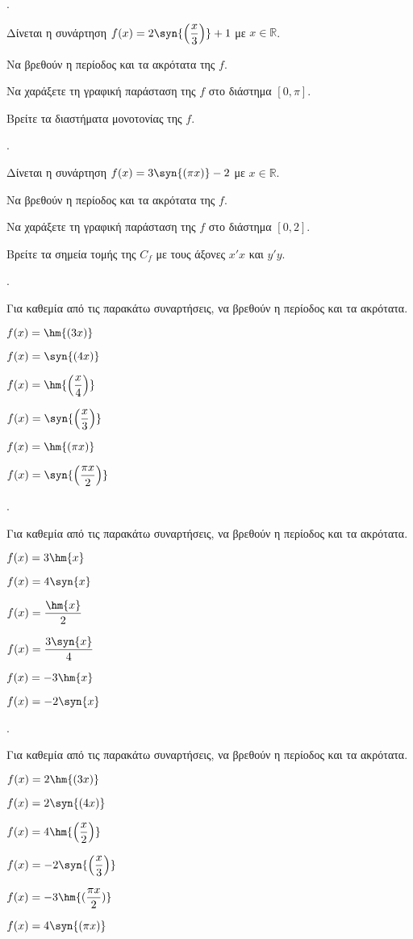\documentclass[11pt,a4paper,twocolumn]{article}
\newcounter{askhsh}
\newcommand{\askhsh}{\large\theaskhsh.\ \addtocounter{askhsh}{1}}
\begin{document}
\askhsh Δίνεται η συνάρτηση $f(x)=2\syn{\left(\dfrac{x}{3}\right)}+1$ με $x\in\mathbb{R}$.
\begin{alist}
\item Να βρεθούν η περίοδος και τα ακρότατα της $f$.
\item Να χαράξετε τη γραφική παράσταση της $f$ στο διάστημα $[0,\pi]$.
\item Βρείτε τα διαστήματα μονοτονίας της $f$.
\end{alist}
\askhsh Δίνεται η συνάρτηση $f(x)=3\syn{\left(\pi x\right)}-2$ με $x\in\mathbb{R}$.
\begin{alist}
\item Να βρεθούν η περίοδος και τα ακρότατα της $f$.
\item Να χαράξετε τη γραφική παράσταση της $f$ στο διάστημα $[0,2]$.
\item Βρείτε τα σημεία τομής της $C_f$ με τους άξονες $x'x$ και $y'y$.
\end{alist}
\askhsh Για καθεμία από τις παρακάτω συναρτήσεις, να βρεθούν η περίοδος και τα ακρότατα.
\begin{multicols}{2}
\begin{alist}
\item $f(x)=\hm{(3x)}$
\item $f(x)=\syn{(4x)}$
\item $f(x)=\hm{\left(\dfrac{x}{4}\right)}$
\item $f(x)=\syn{\left(\dfrac{x}{3}\right)}$
\item $f(x)=\hm{(\pi x)}$
\item $f(x)=\syn{\left(\dfrac{\pi x}{2}\right)}$
\end{alist}
\end{multicols}
\askhsh Για καθεμία από τις παρακάτω συναρτήσεις, να βρεθούν η περίοδος και τα ακρότατα.
\begin{multicols}{2}
\begin{alist}
\item $f(x)=3\hm{x}$
\item $f(x)=4\syn{x}$
\item $f(x)=\dfrac{\hm{x}}{2}$
\item $f(x)=\dfrac{3\syn{x}}{4}$
\item $f(x)=-3\hm{x}$
\item $f(x)=-2\syn{x}$
\end{alist}
\end{multicols}
\askhsh Για καθεμία από τις παρακάτω συναρτήσεις, να βρεθούν η περίοδος και τα ακρότατα.
\begin{multicols}{2}
\begin{alist}
\item $f(x)=2\hm{(3x)}$
\item $f(x)=2\syn{(4x)}$
\item $f(x)=4\hm{\left(\dfrac{x}{2}\right)}$
\item $f(x)=-2\syn{\left(\dfrac{x}{3}\right)}$
\item $f(x)=-3\hm{(\dfrac{\pi x}{2})}$
\item $f(x)=4\syn{\left(\pi x\right)}$
\end{alist}
\end{multicols}
\end{document}
